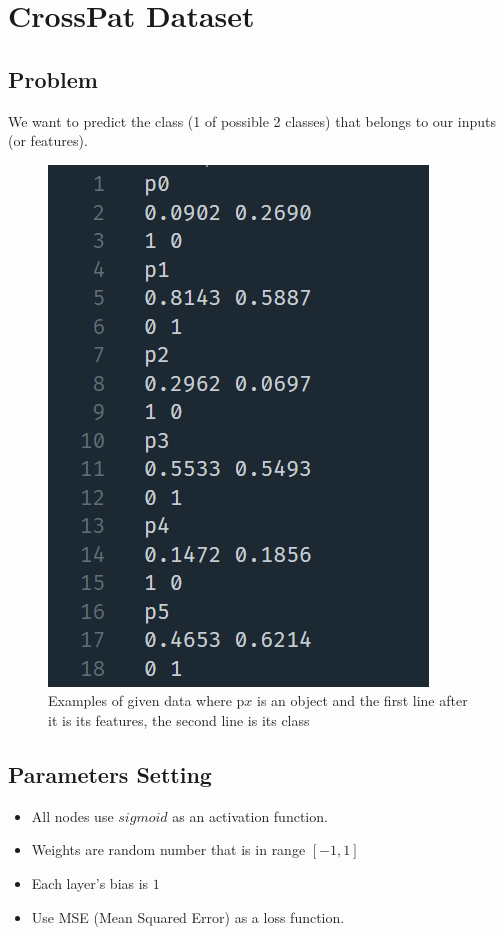 \documentclass{article}
\begin{document}
\newpage
\section*{CrossPat Dataset}
\subsection*{Problem}
We want to predict the class (1 of possible 2 classes) that belongs
to our inputs (or features).

\begin{figure}[ht]
	\centering
	\includegraphics[scale=0.5]{cross_data}
	\caption{Examples of given data where p$x$ is an object and 
	the first line after it is its features, the second line is its class}
\end{figure}
\FloatBarrier

\subsection*{Parameters Setting}
\begin{itemize}
	\item All nodes use $sigmoid$ as an activation function.
	\item Weights are random number that is in range $[-1, 1]$
	\item Each layer's bias is $1$
	\item Use MSE (Mean Squared Error) as a loss function.
\end{itemize}
\end{document}
